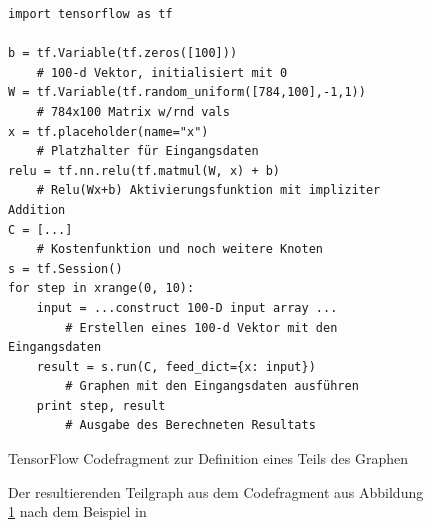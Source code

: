 \begin{figure}
\lstset{language=Python}
\begin{lstlisting}
import tensorflow as tf

b = tf.Variable(tf.zeros([100])) 
	# 100-d Vektor, initialisiert mit 0
W = tf.Variable(tf.random_uniform([784,100],-1,1)) 
	# 784x100 Matrix w/rnd vals
x = tf.placeholder(name="x") 
	# Platzhalter für Eingangsdaten
relu = tf.nn.relu(tf.matmul(W, x) + b) 
	# Relu(Wx+b) Aktivierungsfunktion mit impliziter Addition
C = [...] 
	# Kostenfunktion und noch weitere Knoten
s = tf.Session()
for step in xrange(0, 10):
	input = ...construct 100-D input array ... 
		# Erstellen eines 100-d Vektor mit den Eingangsdaten
	result = s.run(C, feed_dict={x: input}) 
		# Graphen mit den Eingangsdaten ausführen
	print step, result 
		# Ausgabe des Berechneten Resultats
\end{lstlisting}

	\caption{TensorFlow Codefragment zur Definition eines Teils des Graphen}
	\label{fig:SimpleFragmentGraphDefinition}
\end{figure}
\begin{figure}
	\centering


	\caption{Der resultierenden Teilgraph aus dem Codefragment aus Abbildung \ref{fig:SimpleFragmentGraphDefinition} nach dem Beispiel in \cite{wp2015tensorflow}}
	\label{fig:SimpleFragmentGraphPic}
\end{figure}
